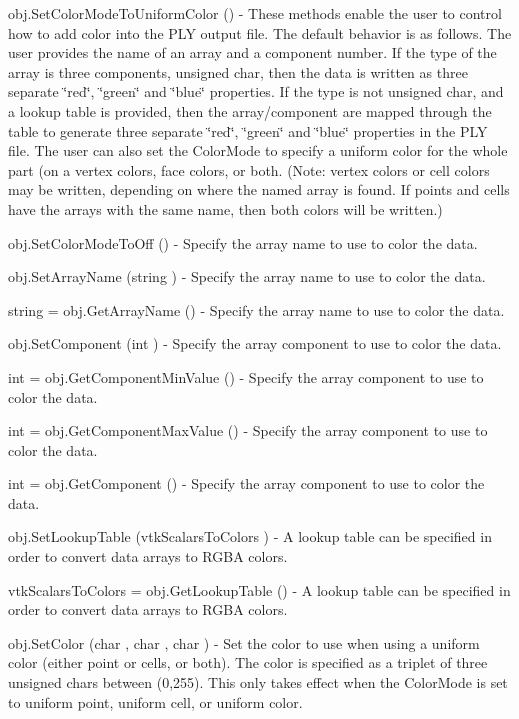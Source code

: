 \begin{DoxyItemize}
\item {\ttfamily obj.\-Set\-Color\-Mode\-To\-Uniform\-Color ()} -\/ These methods enable the user to control how to add color into the P\-L\-Y output file. The default behavior is as follows. The user provides the name of an array and a component number. If the type of the array is three components, unsigned char, then the data is written as three separate \char`\"{}red\char`\"{}, \char`\"{}green\char`\"{} and \char`\"{}blue\char`\"{} properties. If the type is not unsigned char, and a lookup table is provided, then the array/component are mapped through the table to generate three separate \char`\"{}red\char`\"{}, \char`\"{}green\char`\"{} and \char`\"{}blue\char`\"{} properties in the P\-L\-Y file. The user can also set the Color\-Mode to specify a uniform color for the whole part (on a vertex colors, face colors, or both. (Note\-: vertex colors or cell colors may be written, depending on where the named array is found. If points and cells have the arrays with the same name, then both colors will be written.)  
\item {\ttfamily obj.\-Set\-Color\-Mode\-To\-Off ()} -\/ Specify the array name to use to color the data.  
\item {\ttfamily obj.\-Set\-Array\-Name (string )} -\/ Specify the array name to use to color the data.  
\item {\ttfamily string = obj.\-Get\-Array\-Name ()} -\/ Specify the array name to use to color the data.  
\item {\ttfamily obj.\-Set\-Component (int )} -\/ Specify the array component to use to color the data.  
\item {\ttfamily int = obj.\-Get\-Component\-Min\-Value ()} -\/ Specify the array component to use to color the data.  
\item {\ttfamily int = obj.\-Get\-Component\-Max\-Value ()} -\/ Specify the array component to use to color the data.  
\item {\ttfamily int = obj.\-Get\-Component ()} -\/ Specify the array component to use to color the data.  
\item {\ttfamily obj.\-Set\-Lookup\-Table (vtk\-Scalars\-To\-Colors )} -\/ A lookup table can be specified in order to convert data arrays to R\-G\-B\-A colors.  
\item {\ttfamily vtk\-Scalars\-To\-Colors = obj.\-Get\-Lookup\-Table ()} -\/ A lookup table can be specified in order to convert data arrays to R\-G\-B\-A colors.  
\item {\ttfamily obj.\-Set\-Color (char , char , char )} -\/ Set the color to use when using a uniform color (either point or cells, or both). The color is specified as a triplet of three unsigned chars between (0,255). This only takes effect when the Color\-Mode is set to uniform point, uniform cell, or uniform color.  

\end{DoxyItemize}
